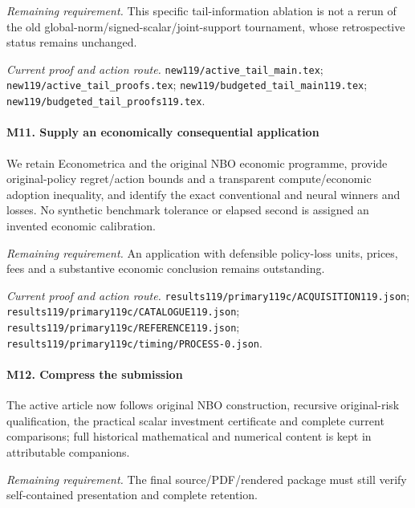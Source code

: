 \par\emph{Remaining requirement.} This specific tail-information ablation is not a rerun of the old global-norm/\allowbreak{}signed-scalar/\allowbreak{}joint-support tournament, whose retrospective status remains unchanged.

\par\emph{Current proof and action route.} \nolinkurl{new119/active_tail_main.tex}; \nolinkurl{new119/active_tail_proofs.tex}; \nolinkurl{new119/budgeted_tail_main119.tex}; \nolinkurl{new119/budgeted_tail_proofs119.tex}.

\paragraph{M11. Supply an economically consequential application}

We retain Econometrica and the original NBO economic programme, provide original-policy regret/\allowbreak{}action bounds and a transparent compute/\allowbreak{}economic adoption inequality, and identify the exact conventional and neural winners and losses. No synthetic benchmark tolerance or elapsed second is assigned an invented economic calibration.

\par\emph{Remaining requirement.} An application with defensible policy-loss units, prices, fees and a substantive economic conclusion remains outstanding.

\par\emph{Current proof and action route.} \nolinkurl{results119/primary119c/ACQUISITION119.json}; \nolinkurl{results119/primary119c/CATALOGUE119.json}; \nolinkurl{results119/primary119c/REFERENCE119.json}; \nolinkurl{results119/primary119c/timing/PROCESS-0.json}.

\paragraph{M12. Compress the submission}

The active article now follows original NBO construction, recursive original-risk qualification, the practical scalar investment certificate and complete current comparisons; full historical mathematical and numerical content is kept in attributable companions.

\par\emph{Remaining requirement.} The final source/\allowbreak{}PDF/\allowbreak{}rendered package must still verify self-contained presentation and complete retention.

